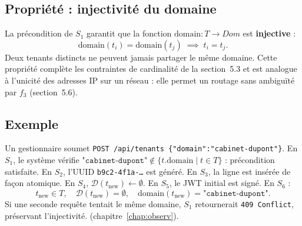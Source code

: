 \subsection{Propriété : injectivité du domaine}

La précondition de $S_1$ garantit que la fonction
$\text{domain} : T \to \mathit{Dom}$ est \textbf{injective} :
\[
\text{domain}(t_i) = \text{domain}(t_j) \;\implies\; t_i = t_j.
\]
Deux tenants distincts ne peuvent jamais partager le même domaine.
Cette propriété complète les contraintes de cardinalité de la
section~5.3 et est analogue à l'unicité des adresses IP sur un
réseau : elle permet un routage sans ambiguïté par $f_3$ (section~5.6).

\subsection{Exemple}

Un gestionnaire soumet
\texttt{POST /api/tenants \{"domain":"cabinet-dupont"\}}.
En $S_1$, le système vérifie
$\texttt{"cabinet-dupont"} \notin \{t.\text{domain} \mid t \in T\}$ :
précondition satisfaite.
En $S_2$, l'UUID \texttt{b9c2-4f1a-\ldots} est généré.
En $S_3$, la ligne est insérée de façon atomique.
En $S_4$, $\mathcal{D}(t_{\text{new}}) \leftarrow \emptyset$.
En $S_5$, le JWT initial est signé.
En $S_6$ :
\[
t_{\text{new}} \in T, \quad
\mathcal{D}(t_{\text{new}}) = \emptyset, \quad
\text{domain}(t_{\text{new}}) = \texttt{"cabinet-dupont"}.
\]
Si une seconde requête tentait le même domaine, $S_1$ retournerait
\texttt{409 Conflict}, préservant l'injectivité.
(chapitre~\ref{chap:observ}).
